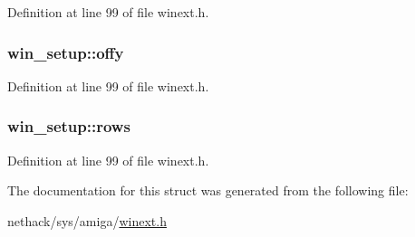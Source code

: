 Definition at line 99 of file winext.\+h.

\hypertarget{structwin__setup_a8ec99922b532540feb6b9d06ab55b07c}{
\subsubsection[{offy}]{ win\+\_\+setup\+::offy}}\label{structwin__setup_a8ec99922b532540feb6b9d06ab55b07c}


Definition at line 99 of file winext.\+h.

\hypertarget{structwin__setup_a5f88ce5b7935c39153a152283bed6058}{
\subsubsection[{rows}]{ win\+\_\+setup\+::rows}}\label{structwin__setup_a5f88ce5b7935c39153a152283bed6058}


Definition at line 99 of file winext.\+h.



The documentation for this struct was generated from the following file\+:\begin{DoxyCompactItemize}
\item 
nethack/sys/amiga/\hyperlink{winext_8h}{winext.\+h}\end{DoxyCompactItemize}
